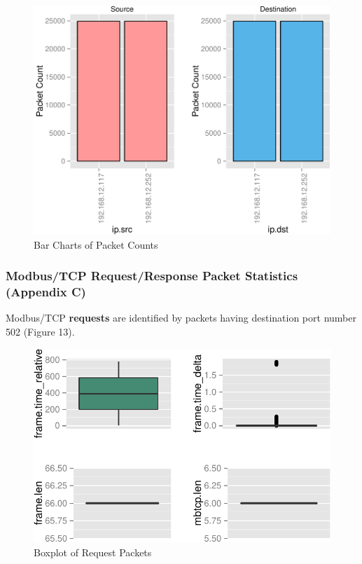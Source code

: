 \documentclass[11pt,]{article}
\begin{document}
\begin{figure}

{\centering \includegraphics{thesis_files/figure-latex/unnamed-chunk-22-1} 

}

\caption{Bar Charts of Packet Counts}\label{fig:unnamed-chunk-22}
\end{figure}

\subsubsection{Modbus/TCP Request/Response Packet Statistics (Appendix
C)}\label{modbustcp-requestresponse-packet-statistics-appendix-c}

Modbus/TCP \textbf{requests} are identified by packets having
destination port number 502 (Figure 13).

\begin{figure}[top]

{\centering \includegraphics{thesis_files/figure-latex/unnamed-chunk-24-1} 

}

\caption{Boxplot of Request Packets}\label{fig:unnamed-chunk-24}
\end{figure}
\end{document}

